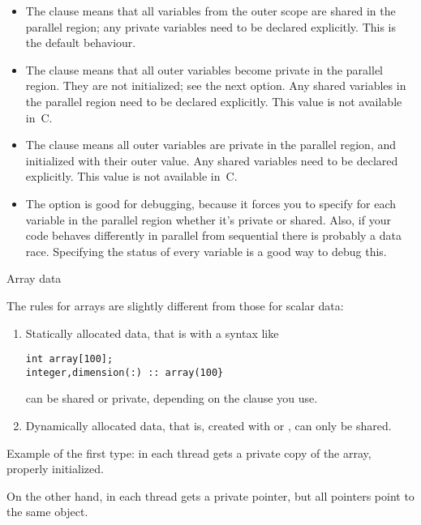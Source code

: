 \begin{itemize}
\item The  clause means that all
  variables from the outer scope are shared in the parallel region; any private variables
  need to be declared explicitly. This is the default behaviour.
\item The  clause means that all
  outer variables become private in the parallel region. They are not
  initialized; see the next option. Any shared variables in the
  parallel region
  need to be declared explicitly. This value is not available in~C.
\item The  clause means all
  outer variables are private in the parallel region, and initialized
  with their outer value.  Any shared variables
  need to be declared explicitly. This value is not available in~C.
\item The  option is good for debugging, 
  because it forces you to specify for each variable in the parallel region
  whether it's private or shared. Also,
  if your code
behaves differently in parallel from sequential there is probably a data race.
Specifying the status of every variable is a good way to
debug this.
\end{itemize}

 {Array data}
\label{sec:omp-array}

The rules for arrays are slightly different from those for scalar data:
\begin{enumerate}
\item Statically allocated data, that is with a syntax like
\begin{lstlisting}
int array[100];
integer,dimension(:) :: array(100}
\end{lstlisting}
can be shared or private, depending on the clause you use.
\item Dynamically allocated data, that is, created with
   or
  , can only be shared.
\end{enumerate}
Example of the first type: in
%
%
each thread gets a private copy of the array, properly initialized.

On the other hand, in
%
%
each thread gets a private pointer, but all pointers point to the same
object.

